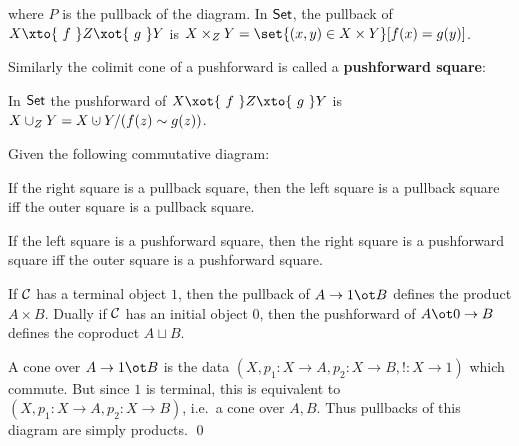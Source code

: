 \noindent where $P$ is the pullback of the diagram.
In ${\sf Set}$, the pullback of $X\xto{\ f\ }Z\xot{\ g\ }Y$ is $X\times_ZY=\set{(x,y)\in X\times Y}[f(x)=g(y)]$.

Similarly the colimit cone of a pushforward is called a {\bf pushforward square}:

\centerline{}

\noindent In ${\sf Set}$ the pushforward of $X\xot{\ f\ }Z\xto{\ g\ }Y$ is $X\cup_ZY=X\dcup Y/(f(z)\sim g(z))$.

\bprop[title=Gluing lemma]

    Given the following commutative diagram:

    \centerline{}

    \benum
        \item If the right square is a pullback square, then the left square is a pullback square iff the outer square is a pullback square.
        \item If the left square is a pushforward square, then the right square is a pushforward square iff the outer square is a pushforward square.
    \eenum

\eprop

\blemm

    If ${{\cal C}}$ has a terminal object $1$, then the pullback of $A\to1\ot B$ defines the product $A\times B$.
    Dually if ${{\cal C}}$ has an initial object $0$, then the pushforward of $A\ot0\to B$ defines the coproduct $A\sqcup B$.

\elemm

\bproof

    A cone over $A\to1\ot B$ is the data $(X,p_1\colon X\to A,p_2\colon X\to B,!\colon X\to1)$ which commute.
    But since $1$ is terminal, this is equivalent to $(X,p_1\colon X\to A,p_2\colon X\to B)$, i.e.\ a cone over $A,B$.
    Thus pullbacks of this diagram are simply products.
    \qed

